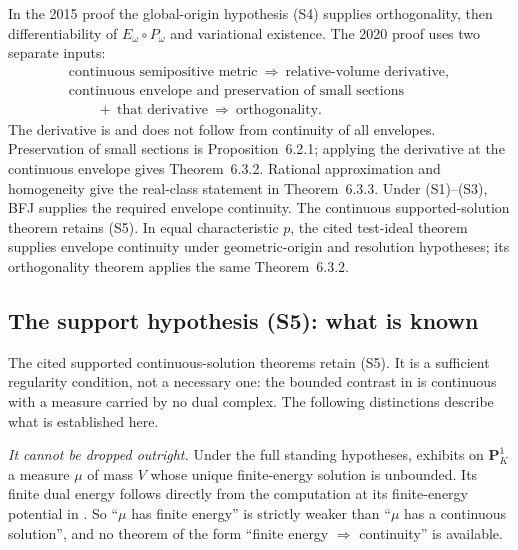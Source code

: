\begin{remark}
\label{rem:ch29-2020-improvement}
In the 2015 proof the global-origin hypothesis \textup{(S4)} supplies
orthogonality, then differentiability of $E_\omega\circ P_\omega$
and variational existence.  The 2020 proof uses two separate inputs:
\[
 \begin{gathered}
 \text{continuous semipositive metric}
   \ \Longrightarrow\ \text{relative-volume derivative},\\
 \text{continuous envelope and preservation of small sections}\\
 \qquad+\ \text{that derivative}
   \ \Longrightarrow\ \text{orthogonality}.
 \end{gathered}
\]
The derivative is \cite[Theorem~5.4.3]{BGGJKM20} and does not follow
from continuity of all envelopes.  Preservation of small sections is
Proposition~6.2.1; applying the derivative at the continuous envelope
gives Theorem~6.3.2.  Rational approximation and homogeneity give the
real-class statement in Theorem~6.3.3.  Under \textup{(S1)}--\textup{(S3)},
BFJ supplies the required envelope continuity.
The continuous supported-solution theorem retains \textup{(S5)}.
In equal characteristic $p$, the cited test-ideal theorem supplies
envelope continuity under geometric-origin and resolution hypotheses;
its orthogonality theorem applies the same Theorem~6.3.2.
\end{remark}

\subsection{The support hypothesis \textup{(S5)}: what is known}
\label{sec:ch29-support-status}

The cited supported continuous-solution theorems retain
\textup{(S5)}.  It is a sufficient regularity condition, not a necessary
one: the bounded contrast in  is
continuous with a measure carried by no dual complex.
The following distinctions describe what is established here.

\emph{It cannot be dropped outright.}  Under the full standing hypotheses,
 exhibits on $\mathbf P^1_K$ a
measure $\mu$ of mass $V$ whose unique finite-energy solution is
unbounded.  Its finite dual energy follows directly from the computation at its
finite-energy potential in .  So ``$\mu$ has finite energy'' is
strictly weaker than ``$\mu$ has a continuous solution'', and no theorem
of the form ``finite energy $\Rightarrow$ continuity'' is available.

